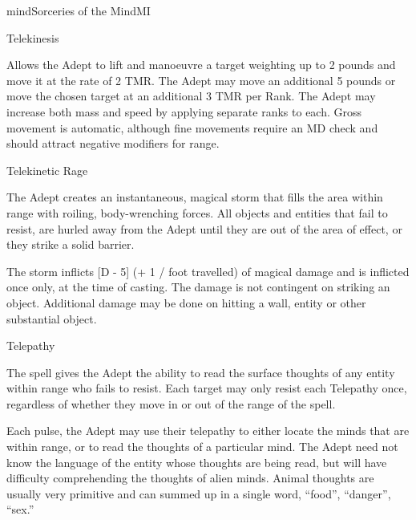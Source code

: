\begin{college}[1.6]{mind}{Sorceries of the Mind}{MI}
\begin{spell}[S-7]{Telekinesis}
\begin{effects}
Allows the Adept to lift and manoeuvre a target weighting up to 2
pounds and move it at the rate of 2 TMR. The Adept may move an
additional 5 pounds or move the chosen target at an additional 3 TMR
per Rank. The Adept may increase both mass and speed by applying
separate ranks to each. Gross movement is automatic, although fine
movements require an MD check and should attract negative modifiers
for range.
\end{effects}
\end{spell}

\begin{spell}[S-8]{Telekinetic Rage}

\begin{effects}
The Adept creates an instantaneous, magical storm that fills the area
within range with roiling, body-wrenching forces. All objects and
entities that fail to resist, are hurled away from the Adept until
they are out of the area of effect, or they strike a solid barrier.

The storm inflicts [D - 5] (+ 1 / foot travelled) of magical damage
and is inflicted once only, at the time of casting. The damage is not
contingent on striking an object. Additional damage may be done on
hitting a wall, entity or other substantial object.
\end{effects}
\end{spell}


\begin{spell}[S-9]{Telepathy}

\begin{effects}
The spell gives the Adept the ability to read the surface thoughts of
any entity within range who fails to resist. Each target may only
resist each Telepathy once, regardless of whether they move in or out
of the range of the spell.

Each pulse, the Adept may use their telepathy to either locate the
minds that are within range, or to read the thoughts of a particular
mind. The Adept need not know the language of the entity whose
thoughts are being read, but will have difficulty comprehending the
thoughts of alien minds. Animal thoughts are usually very primitive
and can summed up in a single word, \eg ``food'', ``danger'', ``sex.''


\end{effects}
\end{spell}
\end{college}
